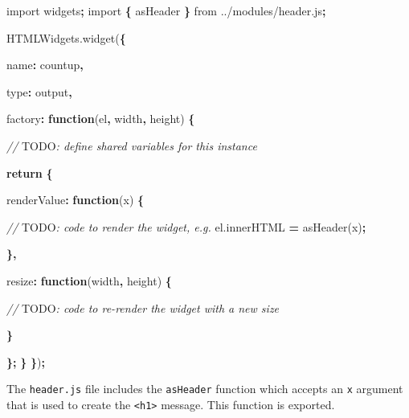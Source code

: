 \documentclass[
]{krantz}
\makeatletter
\newenvironment{Shaded}{\begin{snugshade}}{\end{snugshade}}
\newcommand{\AlertTok}[1]{\textcolor[rgb]{0.33,0.33,0.33}{#1}}
\newcommand{\AttributeTok}[1]{\textcolor[rgb]{0.61,0.61,0.61}{#1}}
\newcommand{\CommentTok}[1]{\textcolor[rgb]{0.37,0.37,0.37}{\textit{#1}}}
\newcommand{\ControlFlowTok}[1]{\textcolor[rgb]{0.27,0.27,0.27}{\textbf{#1}}}
\newcommand{\DataTypeTok}[1]{\textcolor[rgb]{0.27,0.27,0.27}{#1}}
\newcommand{\ImportTok}[1]{#1}
\newcommand{\KeywordTok}[1]{\textcolor[rgb]{0.27,0.27,0.27}{\textbf{#1}}}
\newcommand{\NormalTok}[1]{#1}
\newcommand{\OperatorTok}[1]{\textcolor[rgb]{0.43,0.43,0.43}{\textbf{#1}}}
\newcommand{\StringTok}[1]{\textcolor[rgb]{0.5,0.5,0.5}{#1}}
\newcommand{\VariableTok}[1]{\textcolor[rgb]{0,0,0}{#1}}
\newenvironment{kframe}{%
\medskip{}
\setlength{\fboxsep}{.8em}
 \def\at@end@of@kframe{}%
 \ifinner\ifhmode%
  \def\at@end@of@kframe{\end{minipage}}%
  \begin{minipage}{\columnwidth}%
 \fi\fi%
 \def\FrameCommand##1{\hskip\@totalleftmargin \hskip-\fboxsep
 \colorbox{shadecolor}{##1}\hskip-\fboxsep
     \hskip-\linewidth \hskip-\@totalleftmargin \hskip\columnwidth}%
 \MakeFramed {\advance\hsize-\width
   \@totalleftmargin\z@ \linewidth\hsize
   \@setminipage}}%
 {\par\unskip\endMakeFramed%
 \at@end@of@kframe}
\renewenvironment{Shaded}{\begin{kframe}}{\end{kframe}}
\makeatother
\begin{document}
\begin{Shaded}
\begin{Highlighting}[]
\ImportTok{import} \StringTok{\textquotesingle{}widgets\textquotesingle{}}\OperatorTok{;}
\ImportTok{import} \OperatorTok{\{}\NormalTok{ asHeader }\OperatorTok{\}} \ImportTok{from} \StringTok{\textquotesingle{}../modules/header.js\textquotesingle{}}\OperatorTok{;} 

\VariableTok{HTMLWidgets}\NormalTok{.}\AttributeTok{widget}\NormalTok{(}\OperatorTok{\{}

  \DataTypeTok{name}\OperatorTok{:} \StringTok{\textquotesingle{}countup\textquotesingle{}}\OperatorTok{,}

  \DataTypeTok{type}\OperatorTok{:} \StringTok{\textquotesingle{}output\textquotesingle{}}\OperatorTok{,}

  \DataTypeTok{factory}\OperatorTok{:} \KeywordTok{function}\NormalTok{(el}\OperatorTok{,}\NormalTok{ width}\OperatorTok{,}\NormalTok{ height) }\OperatorTok{\{}

    \CommentTok{// }\AlertTok{TODO}\CommentTok{: define shared variables for this instance}

    \ControlFlowTok{return} \OperatorTok{\{}

      \DataTypeTok{renderValue}\OperatorTok{:} \KeywordTok{function}\NormalTok{(x) }\OperatorTok{\{}

        \CommentTok{// }\AlertTok{TODO}\CommentTok{: code to render the widget, e.g.}
        \VariableTok{el}\NormalTok{.}\AttributeTok{innerHTML} \OperatorTok{=} \AttributeTok{asHeader}\NormalTok{(x)}\OperatorTok{;}

      \OperatorTok{\},}

      \DataTypeTok{resize}\OperatorTok{:} \KeywordTok{function}\NormalTok{(width}\OperatorTok{,}\NormalTok{ height) }\OperatorTok{\{}

        \CommentTok{// }\AlertTok{TODO}\CommentTok{: code to re{-}render the widget with a new size}

      \OperatorTok{\}}

    \OperatorTok{\};}
  \OperatorTok{\}}
\OperatorTok{\}}\NormalTok{)}\OperatorTok{;}
\end{Highlighting}
\end{Shaded}

The \texttt{header.js} file includes the \texttt{asHeader} function which accepts an \texttt{x} argument that is used to create the \texttt{\textless{}h1\textgreater{}} message. This function is exported.
\end{document}

